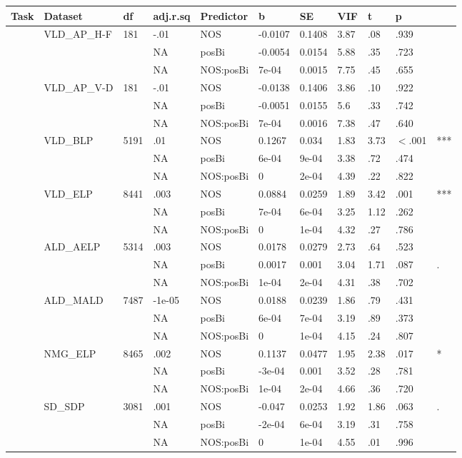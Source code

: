 \begin{table}[ht]
\centering
\begingroup\normalsize
\begin{tabular}{lllllllllll}
  \hline
Task & Dataset & df & adj.r.sq & Predictor & b & SE & VIF & t & p &  \\ 
  \hline
 & VLD\_AP\_H-F & 181 & -.01 & NOS & -0.0107 & 0.1408 & 3.87 & .08 & .939 &   \\ 
   &  &  & NA & posBi & -0.0054 & 0.0154 & 5.88 & .35 & .723 &   \\ 
   &  &  & NA & NOS:posBi & 7e-04 & 0.0015 & 7.75 & .45 & .655 &   \\ 
   & VLD\_AP\_V-D & 181 & -.01 & NOS & -0.0138 & 0.1406 & 3.86 & .10 & .922 &   \\ 
   &  &  & NA & posBi & -0.0051 & 0.0155 & 5.6 & .33 & .742 &   \\ 
   &  &  & NA & NOS:posBi & 7e-04 & 0.0016 & 7.38 & .47 & .640 &   \\ 
   & VLD\_BLP & 5191 & .01 & NOS & 0.1267 & 0.034 & 1.83 & 3.73 & $<$.001 & *** \\ 
   &  &  & NA & posBi & 6e-04 & 9e-04 & 3.38 & .72 & .474 &   \\ 
   &  &  & NA & NOS:posBi & 0 & 2e-04 & 4.39 & .22 & .822 &   \\ 
   & VLD\_ELP & 8441 & .003 & NOS & 0.0884 & 0.0259 & 1.89 & 3.42 & .001 & *** \\ 
   &  &  & NA & posBi & 7e-04 & 6e-04 & 3.25 & 1.12 & .262 &   \\ 
   &  &  & NA & NOS:posBi & 0 & 1e-04 & 4.32 & .27 & .786 &   \\ 
   & ALD\_AELP & 5314 & .003 & NOS & 0.0178 & 0.0279 & 2.73 & .64 & .523 &   \\ 
   &  &  & NA & posBi & 0.0017 & 0.001 & 3.04 & 1.71 & .087 & . \\ 
   &  &  & NA & NOS:posBi & 1e-04 & 2e-04 & 4.31 & .38 & .702 &   \\ 
   & ALD\_MALD & 7487 & -1e-05 & NOS & 0.0188 & 0.0239 & 1.86 & .79 & .431 &   \\ 
   &  &  & NA & posBi & 6e-04 & 7e-04 & 3.19 & .89 & .373 &   \\ 
   &  &  & NA & NOS:posBi & 0 & 1e-04 & 4.15 & .24 & .807 &   \\ 
   & NMG\_ELP & 8465 & .002 & NOS & 0.1137 & 0.0477 & 1.95 & 2.38 & .017 & * \\ 
   &  &  & NA & posBi & -3e-04 & 0.001 & 3.52 & .28 & .781 &   \\ 
   &  &  & NA & NOS:posBi & 1e-04 & 2e-04 & 4.66 & .36 & .720 &   \\ 
   & SD\_SDP & 3081 & .001 & NOS & -0.047 & 0.0253 & 1.92 & 1.86 & .063 & . \\ 
   &  &  & NA & posBi & -2e-04 & 6e-04 & 3.19 & .31 & .758 &   \\ 
   &  &  & NA & NOS:posBi & 0 & 1e-04 & 4.55 & .01 & .996 &   \\ 
   \hline
\end{tabular}
\endgroup
\end{table}
